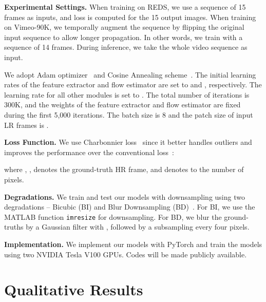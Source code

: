 \documentclass[final]{cvpr}
\begin{document}
\vspace{0.15cm}
\noindent\textbf{Experimental Settings.}
When training on REDS, we use a sequence of 15 frames as inputs, and loss is computed for the 15 output images. When training on Vimeo-90K, we temporally augment the sequence by flipping the original input sequence to allow longer propagation. In other words, we train with a sequence of 14 frames. During inference, we take the whole video sequence as input.

We adopt Adam optimizer~\cite{kingma2014adam} and Cosine Annealing scheme~\cite{loshchilov2016sgdr}. The initial learning rates of the feature extractor and flow estimator are set to  and , respectively. The learning rate for all other modules is set to . The total number of iterations is 300K, and the weights of the feature extractor and flow estimator are fixed during the first 5,000 iterations. The batch size is 8 and the patch size of input LR frames is .
\vspace{0.15cm}

\noindent\textbf{Loss Function.}
We use Charbonnier loss~\cite{charbonnier1994two} since it better handles outliers and improves the performance over the conventional  loss~\cite{lai2017deep}:

where , ,  denotes the ground-truth HR frame, and  denotes to the number of pixels.
\vspace{0.15cm}

\noindent\textbf{Degradations.}
We train and test our models with  downsampling using two degradations -- Bicubic (BI) and Blur Downsampling (BD)~\cite{isobe2020video1,sajjadi2018frame}. For BI, we use the MATLAB function \texttt{imresize} for downsampling. For BD, we blur the ground-truths by a Gaussian filter with , followed by a subsampling every four pixels.
\vspace{0.15cm}

\noindent\textbf{Implementation.}
We implement our models with PyTorch and train the models using two NVIDIA Tesla V100 GPUs. Codes will be made publicly available.




\section{Qualitative Results}
\end{document}
